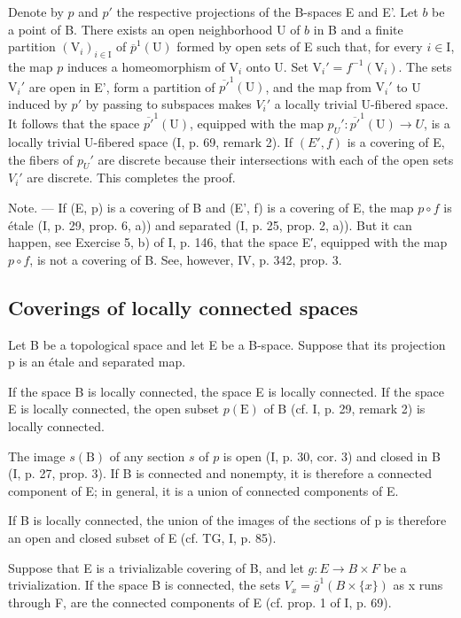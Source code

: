 Denote by \(p\) and \(p'\) the respective projections of the B-spaces E and E'. Let \(b\) be a point of B. There exists an open neighborhood U of \(b\) in B and a finite partition \((\mathrm{V}_i)_{i\in \mathrm{I}}\) of \(\overline{p}^1 (\mathrm{U})\) formed by open sets of E such that, for every \(i\in \mathrm{I}\), the map \(p\) induces a homeomorphism of \(\mathrm{V}_i\) onto U. Set \(\mathrm{V}_i' = f^{-1}(\mathrm{V}_i)\). The sets \(\mathrm{V}_i'\) are open in E', form a partition of \(\overline{p'}^{1}(\mathrm{U})\), and the map from \(\mathrm{V}_i'\) to U induced by \(p'\) by passing to subspaces makes \(V_i'\) a locally trivial U-fibered space. It follows that the space \(\overline{p'}^{1}(\mathrm{U})\), equipped with the map \(p_U': \overline{p'}^{1}(\mathrm{U}) \to U\), is a locally trivial U-fibered space (I, p. 69, remark 2). If \((E', f)\) is a covering of E, the fibers of \(p_U'\) are discrete because their intersections with each of the open sets \(V_i'\) are discrete. This completes the proof.

Note. --- If (E, p) is a covering of B and (E', f) is a covering of E, the map \(p \circ f\) is étale (I, p. 29, prop. 6, a)) and separated (I, p. 25, prop. 2, a)). But it can happen, see Exercise 5, b) of I, p. 146, that the space E′, equipped with the map \(p \circ f\), is not a covering of B. See, however, IV, p. 342, prop. 3.

\subsection{Coverings of locally connected spaces}

Let B be a topological space and let E be a B-space. Suppose that its projection p is an étale and separated map.

If the space B is locally connected, the space E is locally connected. If the space E is locally connected, the open subset \(p(\mathrm{E})\) of B (cf. I, p. 29, remark 2) is locally connected.

The image \(s(\mathrm{B})\) of any section \(s\) of \(p\) is open (I, p. 30, cor. 3) and closed in B (I, p. 27, prop. 3). If B is connected and nonempty, it is therefore a connected component of E; in general, it is a union of connected components of E.

If B is locally connected, the union of the images of the sections of p is therefore an open and closed subset of E (cf. TG, I, p. 85).

Suppose that E is a trivializable covering of B, and let \(g: E \to B \times F\) be a trivialization. If the space B is connected, the sets \(V_{x} = \overline{g}^{1}(B \times \{x\})\) as x runs through F, are the connected components of E (cf. prop. 1 of I, p. 69).

